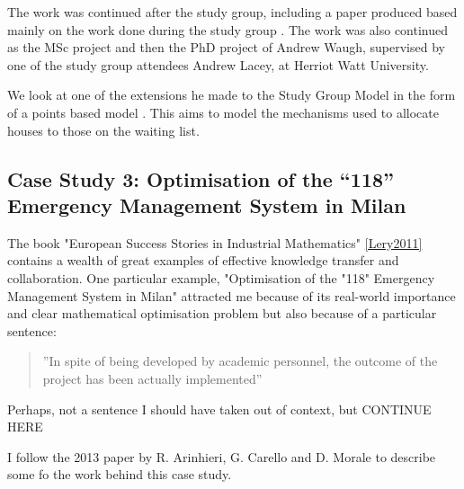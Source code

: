 \documentclass[11pt]{article} %
\begin{document}
	The work was continued after the study group, including a paper produced based mainly on the work done during the study group \cite{Byatt-Smith2003}. The work was also continued as the MSc project and then the PhD project of Andrew Waugh, supervised by one of the study group attendees Andrew Lacey, at Herriot Watt University. 
	
	We look at one of the extensions he made to the Study Group Model in the form of a points based model \cite{Waugh1999}. This aims to model the mechanisms used to allocate houses to those on the waiting list. 
	
	
	
	\subsection{Case Study 3: Optimisation of the “118” Emergency Management System in Milan \label{Milan} }
	The book "European Success Stories in Industrial Mathematics" \ref{Lery2011} contains a wealth of great examples of effective knowledge transfer and collaboration. One particular example, "Optimisation of the "118" Emergency Management System in Milan" attracted me because of its real-world importance and clear mathematical optimisation problem but also because of a particular sentence: 
	
	\begin{quote}
		''In spite of being developed by academic personnel, the outcome of the project has been actually implemented''
	\end{quote}

	Perhaps, not a sentence I should have taken out of context, but CONTINUE HERE 
	
	

	I follow the 2013 paper by R. Arinhieri, G. Carello and D. Morale \cite{R.AringhieriG.Carello2013}  to describe some fo the work behind this case study.
	
\end{document}
